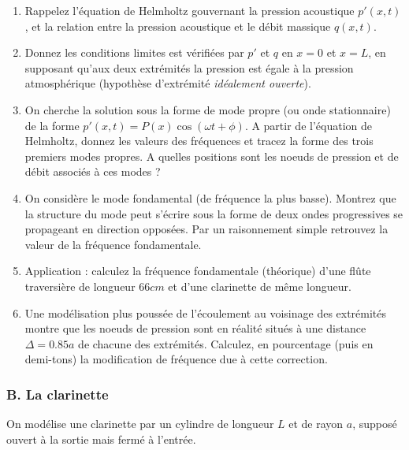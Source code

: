 \begin{enumerate}
\item 
Rappelez l'équation de Helmholtz gouvernant la pression acoustique $p'(x,t)$, et la relation entre la pression acoustique et le débit massique $q(x,t)$.


\item Donnez les conditions limites est vérifiées par $p'$ et $q$ en $x=0$ et $x=L$, en 
supposant qu'aux deux extrémités la pression est égale à la pression atmosphérique (hypothèse d'extrémité {\em idéalement ouverte}).

\item On cherche la solution sous la forme de mode propre (ou onde stationnaire) de la forme 
$p'(x,t) = P(x) \cos (\omega t+ \phi)$. A partir de l'équation de Helmholtz, donnez les valeurs des fréquences et tracez la forme des trois premiers modes propres. A quelles positions sont les noeuds de pression et de débit associés à ces modes ?

\item On considère le mode fondamental (de fréquence la plus basse). Montrez que la structure du mode peut s'écrire sous la forme de deux ondes progressives se propageant en direction opposées. Par un raisonnement simple retrouvez la valeur de la fréquence fondamentale.

\item Application : calculez la fréquence fondamentale (théorique) d'une flûte traversière de 
longueur $66cm$ et d'une clarinette de même longueur.

\item Une modélisation plus poussée de l'écoulement au voisinage des extrémités montre 
que les noeuds de pression sont en réalité situés à une distance $\Delta = 0.85 a$ de chacune des extrémités. Calculez, en pourcentage (puis en demi-tons) la modification de fréquence due à cette correction.

\end{enumerate}


\subsubsection*{B. La clarinette}

On modélise une clarinette par un cylindre de longueur $L$ et de rayon $a$, 
supposé ouvert à la sortie mais fermé à l'entrée.

